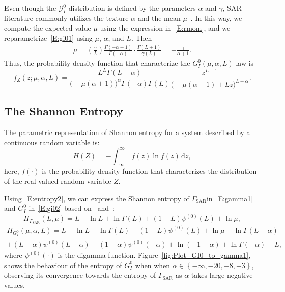 \documentclass[remotesensing,article,submit,moreauthors,pdftex]{Definitions/mdpi}
\begin{document}
Even though the \(\mathcal{G}_I^0\) distribution is defined by the
parameters \(\alpha\) and \(\gamma\), SAR literature commonly utilizes
the texture \(\alpha\) and the mean \(\mu\)~\cite{Nascimento2010}. In
this way, we compute the expected value \(\mu\) using the expression
in~\eqref{E:rmom}, and we reparametrize~\eqref{E:gi01} using \(\mu\),
\(\alpha\), and \(L\). Then \begin{align*}
    \mu=\left(\frac{\gamma}{L}\right)\frac{\Gamma(-\alpha-1)}{\Gamma(-\alpha)}\cdot\frac{\Gamma(L+1)}{\gamma(L)}=-\frac{\gamma}{\alpha+1}.
\end{align*} Thus, the probability density function that characterize
the \(G_I^0(\mu, \alpha, L)\) law is \begin{equation}
        f_Z(z; \mu, \alpha, L)=\frac{L^L\Gamma(L-\alpha)}{\big(-\mu(\alpha+1)\big)^{\alpha}\Gamma(-\alpha)\Gamma(L)} \frac{z^{L-1}}{\big(-\mu(\alpha+1)+Lz\big)^{L-\alpha}}.\label{E:gi02}
\end{equation}

\hypertarget{the-shannon-entropy}{%
\subsection{The Shannon Entropy}\label{the-shannon-entropy}}

The parametric representation of Shannon entropy for a system described
by a continuous random variable is: \begin{equation}
  \label{E:entropy2}
  H(Z)=-\int_{-\infty }^\infty \ f(z)\ln f(z)\, \mathrm{d}z,
\end{equation} here, \(f(\cdot)\) is the probability density function
that characterizes the distribution of the real-valued random variable
\(Z\).

Using~\eqref{E:entropy2}, we can express the Shannon entropy of
\(\Gamma_{\text{SAR}}\)in~\eqref{E:gamma1} and \(G_I^0\)
in~\eqref{E:gi02} based on~\cite{Cassetti2022} and~\cite{Ferreira2020}:
\begin{equation}
\label{E:E-gamma}
H_{\Gamma_{\text{SAR}}}(L, \mu) =   L -\ln L+\ln\Gamma(L)+(1-L)\psi^{(0)}(L) + \ln \mu, 
\end{equation} \begin{multline}
\label{E:E-GIO}
H_{G_I^0}(\mu, \alpha, L) =L -\ln L+\ln\Gamma(L)+(1-L)\psi^{(0)}(L) +\ln \mu -\ln\Gamma(L-\alpha)\\
+ (L-\alpha) \psi^{(0)}(L-\alpha)-(1-\alpha)\psi^{(0)}(-\alpha)+\ln (-1-\alpha)+\ln\Gamma(-\alpha)-L,
\end{multline} where \(\psi^{(0)}(\cdot)\) is the digamma function.
Figure~\ref{fig:Plot_GI0_to_gamma1}, shows the behaviour of the entropy
of \(G_I^0\) when when
\(\alpha \in \left\{-\infty, -20, -8, -3\right\}\), observing its
convergence towards the entropy of \(\Gamma_{\text{SAR}}\) as \(\alpha\)
takes large negative values.
\end{document}
